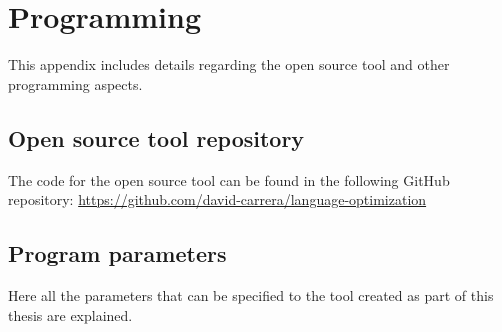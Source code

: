 \chapter{Programming}
\label{cha:code}

This appendix includes details regarding the open source tool and other programming aspects.

\section{Open source tool repository}

The code for the open source tool can be found in the following GitHub repository: \url{https://github.com/david-carrera/language-optimization}

\section{Program parameters}
\label{sec:app_code_program-parameters}

Here all the parameters that can be specified to the tool created as part of this thesis are explained.

